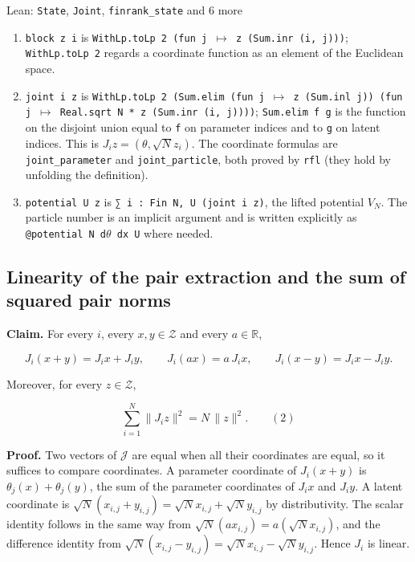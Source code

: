 \documentclass[11pt,a4paper]{report}
\begin{document}
\begin{leanbox}{Lean: \texttt{State}, \texttt{Joint}, \texttt{finrank\_\allowbreak{}state} and 6 more}
\begin{enumerate}
\item \texttt{block z i} is \texttt{With\allowbreak{}Lp.\allowbreak{}to\allowbreak{}Lp 2 (fun j \ensuremath{\mapsto} z (Sum.\allowbreak{}inr (i, j)))}; \texttt{With\allowbreak{}Lp.\allowbreak{}to\allowbreak{}Lp 2} regards a coordinate function as an element of the Euclidean space.

\item \texttt{joint i z} is \texttt{With\allowbreak{}Lp.\allowbreak{}to\allowbreak{}Lp 2 (Sum.\allowbreak{}elim (fun j \ensuremath{\mapsto} z (Sum.\allowbreak{}inl j)) (fun j \ensuremath{\mapsto} Real.\allowbreak{}sqrt N * z (Sum.\allowbreak{}inr (i, j))))}; \texttt{Sum.\allowbreak{}elim f g} is the function on the disjoint union equal to \texttt{f} on parameter indices and to \texttt{g} on latent indices. This is \(J_iz=(\theta,\sqrt Nz_i)\). The coordinate formulas are \texttt{joint\_\allowbreak{}parameter} and \texttt{joint\_\allowbreak{}particle}, both proved by \texttt{rfl} (they hold by unfolding the definition).

\item \texttt{potential U z} is \texttt{∑ i : Fin N, U (joint i z)}, the lifted potential \(V_N\). The particle number is an implicit argument and is written explicitly as \texttt{@potential N d\ensuremath{\theta} dx U} where needed.

\end{enumerate}
\end{leanbox}
\subsection{\texorpdfstring{Linearity of the pair extraction and the sum of squared pair norms}{Linearity of the pair extraction and the sum of squared pair norms}}
\label{report-step-IPLA-Geometry-lean-2}


\textbf{Claim.} For every \(i\), every \(x,y\in\mathcal Z\) and every \(a\in\mathbb R\),


\[J_i(x+y)=J_ix+J_iy,\qquad J_i(ax)=a\,J_ix,\qquad J_i(x-y)=J_ix-J_iy .\]


Moreover, for every \(z\in\mathcal Z\),


\[\sum_{i=1}^N\|J_iz\|^2=N\,\|z\|^2 .\qquad(2)\]


\textbf{Proof.} Two vectors of \(\mathcal J\) are equal when all their coordinates are equal, so it suffices to compare coordinates. A parameter coordinate of \(J_i(x+y)\) is \(\theta_j(x)+\theta_j(y)\), the sum of the parameter coordinates of \(J_ix\) and \(J_iy\). A latent coordinate is \(\sqrt N(x_{i,j}+y_{i,j})=\sqrt Nx_{i,j}+\sqrt Ny_{i,j}\) by distributivity. The scalar identity follows in the same way from \(\sqrt N(ax_{i,j})=a(\sqrt Nx_{i,j})\), and the difference identity from \(\sqrt N(x_{i,j}-y_{i,j})=\sqrt Nx_{i,j}-\sqrt Ny_{i,j}\). Hence \(J_i\) is linear.
\end{document}

